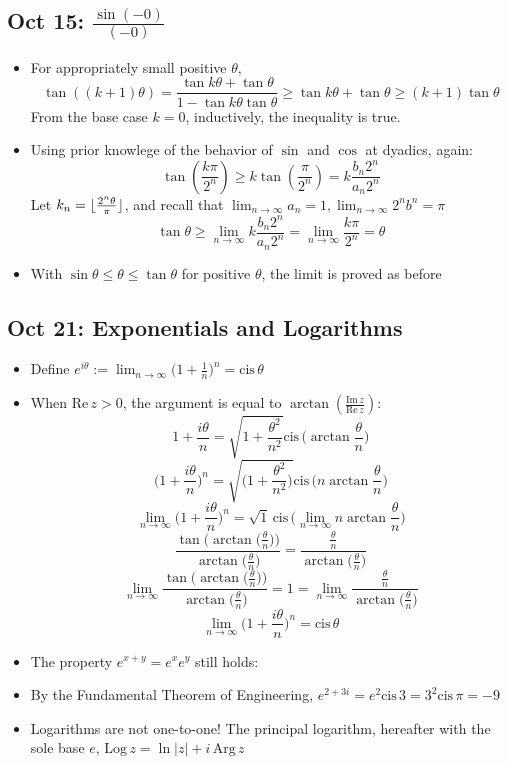 \documentclass[10pt, oneside]{article}
\newcommand{\lti}[1]{\lim_{#1 \rightarrow \infty}}
\let\leq\leqslant
\let\geq\geqslant
\DeclarePairedDelimiter\floor{\lfloor}{\rfloor}
\newcommand{\cis}{\text{cis} \,}
\renewcommand{\Re}{\text{Re} \,}
\renewcommand{\Im}{\text{Im} \,}
\newcommand{\Arg}{\text{Arg} \,}
\newcommand{\Log}{\text{Log} \,}
\begin{document}
\subsection{Oct 15: $\frac{\sin (-0)}{(-0)}$}
\begin{itemize}
    \item For appropriately small positive $\theta$,
        \[\tan((k+1) \theta) = \frac{\tan k\theta + \tan \theta}{1 - \tan k\theta \tan \theta} \geq \tan k\theta + \tan \theta \geq (k+1)\tan \theta\]
    From the base case $k = 0$, inductively, the inequality is true.
    \item Using prior knowlege of the behavior of $\sin$ and $\cos$ at dyadics, again:
        \[\tan(\frac{k \pi}{2^n}) \geq k \tan(\frac{\pi}{2^n}) = k \frac{b_n 2^n}{a_n 2^n}\]
        Let $k_n = \floor{\frac{2^n \theta}{\pi}}$, and recall that $\displaystyle \lti{n} a_n = 1, \lti{n} 2^n b^n = \pi$
        \[\tan \theta \geq \lti{n} k \frac{b_n 2^n}{a_n 2^n} = \lti{n} \frac{k \pi}{2^n} = \theta\]
    \item With $\sin \theta \leq \theta \leq \tan \theta$ for positive $\theta$, the limit is proved as before
\end{itemize}

\subsection{Oct 21: Exponentials and Logarithms}
\begin{itemize}
    \item Define $\displaystyle e^{i \theta} := \lti{n} \Big( 1 + \frac{1}{n} \Big) ^n = \cis \theta$
    \item When $\Re z > 0$, the argument is equal to $\arctan(\frac{\Im z}{\Re z})$:
        \[1 + \frac{i \theta}{n} = \sqrt{1 + \frac{\theta^2}{n^2}} \cis \Big( \arctan \frac{\theta}{n}\Big)\]
        \[\Big( 1 + \frac{i \theta}{n} \Big) ^ n = \sqrt{\Big( 1 + \frac{\theta ^2}{n^2}\Big)} \cis \Big(n \arctan \frac{\theta}{n}\Big)\]
        \[\lti{n} \Big( 1 + \frac{i \theta}{n} \Big) ^ n = \sqrt{1} \, \cis \Big( \lti{n} n \arctan \frac{\theta}{n}\Big)\]
        \[\frac{\tan\Big( \arctan \Big( \frac{\theta}{n} \Big) \Big)}{\arctan \Big( \frac{\theta}{n} \Big)} = \frac{\frac{\theta}{n}}{\arctan \Big( \frac{\theta}{n} \Big)}\]
        \[\lti{n} \frac{\tan\Big( \arctan \Big( \frac{\theta}{n} \Big) \Big)}{\arctan \Big( \frac{\theta}{n} \Big)} = 1 = \lti{n} \frac{\frac{\theta}{n}}{\arctan \Big( \frac{\theta}{n} \Big)}\]
        \[\lti{n} \Big( 1 + \frac{i \theta}{n} \Big) ^ n = \cis \theta\]
    \item The property $e^{x + y} = e^x e^y$ still holds:
    \item By the Fundamental Theorem of Engineering, $e^{2 + 3i} = e^2 \cis 3 = 3^2 \cis \pi = -9$
    \item Logarithms are not one-to-one! The principal logarithm, hereafter with the sole base $e$, $\Log z = \ln |z| + i \, \Arg z$
\end{itemize}
\end{document}
